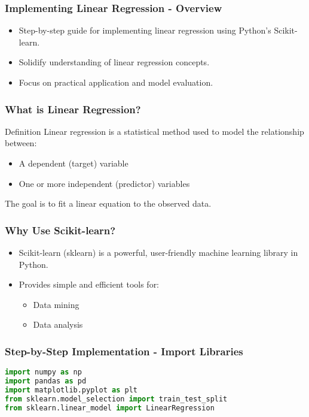 \documentclass[aspectratio=169]{beamer}
\begin{document}
\begin{frame}[fragile]
    \frametitle{Implementing Linear Regression - Overview}
    \begin{itemize}
        \item Step-by-step guide for implementing linear regression using Python's Scikit-learn.
        \item Solidify understanding of linear regression concepts.
        \item Focus on practical application and model evaluation.
    \end{itemize}
\end{frame}

\begin{frame}[fragile]
    \frametitle{What is Linear Regression?}
    \begin{block}{Definition}
        Linear regression is a statistical method used to model the relationship between:
        \begin{itemize}
            \item A dependent (target) variable
            \item One or more independent (predictor) variables
        \end{itemize}
        The goal is to fit a linear equation to the observed data.
    \end{block}
\end{frame}

\begin{frame}[fragile]
    \frametitle{Why Use Scikit-learn?}
    \begin{itemize}
        \item Scikit-learn (sklearn) is a powerful, user-friendly machine learning library in Python.
        \item Provides simple and efficient tools for:
        \begin{itemize}
            \item Data mining
            \item Data analysis
        \end{itemize}
    \end{itemize}
\end{frame}

\begin{frame}[fragile]
    \frametitle{Step-by-Step Implementation - Import Libraries}
    \begin{lstlisting}[language=Python]
import numpy as np
import pandas as pd
import matplotlib.pyplot as plt
from sklearn.model_selection import train_test_split
from sklearn.linear_model import LinearRegression
    \end{lstlisting}
\end{frame}
\end{document}
